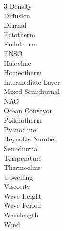 
\begin{multicols}{3}
Density\\
Diffusion\\
Diurnal\\
Ectotherm\\
Endotherm\\
ENSO\\
Halocline\\
Homeotherm\\
Intermediate Layer\\
Mixed Semidiurnal\\
NAO\\
Ocean Conveyor\\
Poikilotherm\\
Pycnocline\\
Reynolds Number\\
Semidiurnal\\
Temperature\\
Thermocline\\
Upwelling\\
Viscosity\\
Wave Height\\
Wave Period\\
Wavelength\\
Wind
\end{multicols}
